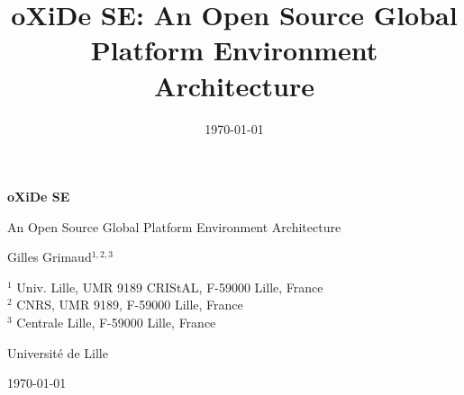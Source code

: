 \documentclass[a4paper,11pt,twoside,openright]{book}
\title{oXiDe SE: An Open Source Global Platform Environment Architecture}
\author{}
\date{\today}
\begin{document}
\begin{titlepage}
\centering

\vspace*{2cm}

{\Huge \textbf{oXiDe SE} \par}

\vspace{0.5cm}

{\Large An Open Source Global Platform Environment Architecture \par}

\vspace{1.5cm}

{\Large Gilles Grimaud$^{1,2,3}$ \par}

\vspace{0.5cm}

\small
$^{1}$ Univ. Lille, UMR 9189 CRIStAL, F-59000 Lille, France\\
$^{2}$ CNRS, UMR 9189, F-59000 Lille, France\\
$^{3}$ Centrale Lille, F-59000 Lille, France

\vspace{1cm}

{\large Université de Lille}

\vspace{1cm}

{\large \today}

\vfill

\end{titlepage}

\tableofcontents
\newpage
\end{document}
